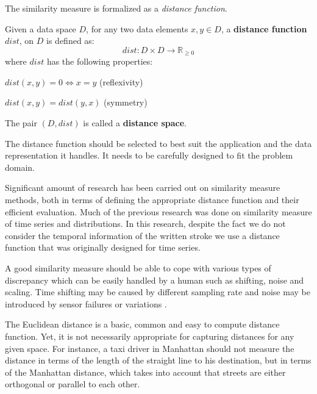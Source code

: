 \iftoggle{edit-mode}{\hspace{0pt}\marginpar{Distance function formal definition}}{}
The similarity measure is formalized as a \emph{distance function}. 
\begin{definition}
Given a data space $D$, for any two data elements $x,y \in D$, a \textbf{distance function} $dist$, on $D$ is defined as:
\begin{equation}
dist: D \times D \longrightarrow \mathbb R_{\geq 0} 
\end{equation}
where $dist$ has the following properties:
\begin{compactitem}
\item $dist(x,y)=0 \Leftrightarrow x=y$ (reflexivity)
\item $dist(x,y) = dist(y,x)$ (symmetry)
\end{compactitem}
The pair $(D,dist)$ is called a \textbf{distance space}.
\label{def:distance_function}
\end{definition}

\iftoggle{edit-mode}{\hspace{0pt}\marginpar{Distance function selection}}{}
The distance function should be selected to best suit the application and the data representation it handles. It needs to be carefully designed to fit the problem domain.

\iftoggle{edit-mode}{\hspace{0pt}\marginpar{Previous research}}{}
Significant amount of research has been carried out on similarity measure methods, both in terms of defining the appropriate distance function and their efficient evaluation. Much of the previous research was done on similarity measure of time series and distributions. In this research, despite the fact we do not consider the temporal information of the written stroke we use a distance function that was originally designed for time series.

\iftoggle{edit-mode}{\hspace{0pt}\marginpar{Properties of a good dissimilarity measure.}}{}
A good similarity measure should be able to cope with various types of discrepancy which can be easily handled by a human such as shifting, noise and scaling. Time shifting may be caused by different sampling rate and noise may be introduced by sensor failures or variations \cite{chen2005similarity}.

\iftoggle{edit-mode}{\hspace{0pt}\marginpar{Euclidean and Manhattan}}{}
The Euclidean distance is a basic, common and easy to compute distance function. Yet, it is not necessarily appropriate for capturing distances for any given space. For instance, a taxi driver in Manhattan should not measure the distance in terms of the length of the straight line to his destination, but in terms of the Manhattan distance, which takes into account that streets are either orthogonal or parallel to each other.

